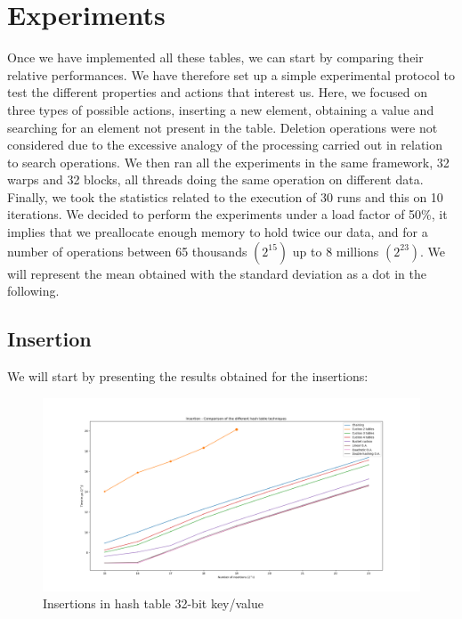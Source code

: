 
\section{Experiments}

Once we have implemented all these tables, we can start by comparing their relative performances. We have therefore set up a simple experimental protocol to test the different properties and actions that interest us. Here, we focused on three types of possible actions, inserting a new element, obtaining a value and searching for an element not present in the table. Deletion operations were not considered due to the excessive analogy of the processing carried out in relation to search operations. We then ran all the experiments in the same framework, 32 warps and 32 blocks, all threads doing the same operation on different data. Finally, we took the statistics related to the execution of 30 runs and this on 10 iterations. We decided to perform the experiments under a load factor of 50\%, it implies that we preallocate enough memory to hold twice our data, and for a number of operations between 65 thousands $(2^{15})$ up to 8 millions $(2^{23})$. We will represent the mean obtained with the standard deviation as a dot in the following.

\subsection{Insertion}

We will start by presenting the results obtained for the insertions:

\begin{figure}[!ht]
\centering
\includegraphics[width=\linewidth]{Chapters/HashTable/Results/DictionaryInsertions.png} 
\caption{Insertions in hash table 32-bit key/value}
\end{figure}

